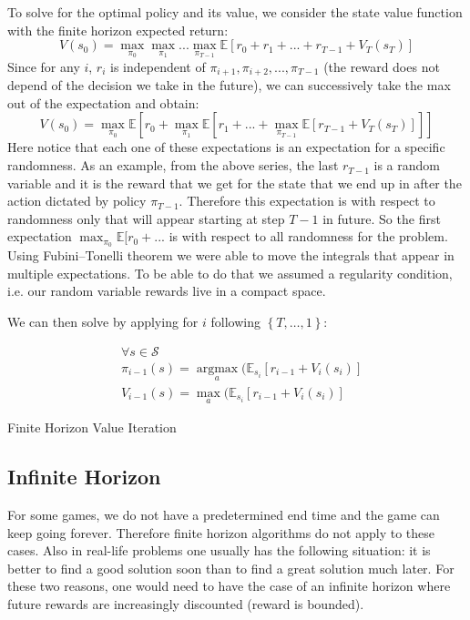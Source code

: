 \documentclass{article}
\begin{document}
To solve for the optimal policy and its value, we consider the state value function with the finite horizon expected return: \\
\[
V(s_{0}) = \max_{\pi_{0}}\max_{\pi_{1}}...\max_{\pi_{T-1}}\mathbb{E}[r_{0}+r_{1}+...+r_{T-1}+V_{T}(s_{T})]
\]
Since for any $i$, $r_{i}$ is independent of $\pi_{i+1},\pi_{i+2},...,\pi_{T-1}$ (the reward does not depend of the decision we take in the future), we can successively take the max out of the expectation and obtain:
\[
V(s_{0}) = \max_{\pi_{0}}\mathbb{E}[r_{0}+\max_{\pi_{1}}\mathbb{E}[r_{1}+...+\max_{\pi_{T-1}}\mathbb{E}[r_{T-1}+V_{T}(s_{T})]]]
\]
Here notice that each one of these expectations is an expectation for a specific randomness. As an example, from the above series, the last $r_{T-1}$ is a random variable and it is the reward that we get for the state that we end up in after the action dictated by policy $\pi_{T-1}$. Therefore this expectation is with respect to randomness only that will appear starting at step $T-1$ in future. So the first expectation $\max_{\pi_{0}}\mathbb{E}[r_{0}+ ... $ is with respect to all randomness for the problem. Using Fubini–Tonelli theorem we were able to move the integrals that appear in multiple expectations. To be able to do that we assumed a regularity condition, i.e. our random variable rewards live in a compact space.

We can then solve by applying for $i$ following $\left\{T,\ldots,1\right\}$:

\begin{align*}
&\forall s\in\mathcal{S} \\
&\pi_{i-1}(s)=\underset{a}{\operatorname{argmax}}(\mathbb{E}_{s_{i}}[r_{i-1}+V_{i}(s_{i})] \\
&V_{i-1}(s)=\max_{a}(\mathbb{E}_{s_{i}}[r_{i-1}+V_{i}(s_{i})]
\end{align*}

\begin{algorithm}[H]
\SetAlgoLined
 \caption{Finite Horizon Value Iteration}
 \label{alg:finite_horizon_VI}
\end{algorithm}

\subsection{Infinite Horizon}
For some games, we do not have a predetermined end time and the game can keep going forever. Therefore finite horizon algorithms do not apply to these cases. Also in real-life problems one usually has the following situation: it is better to find a good solution soon than to find a great solution much later. For these two reasons, one would need to have the case of an infinite horizon where future rewards are increasingly discounted (reward is bounded).
\end{document}
